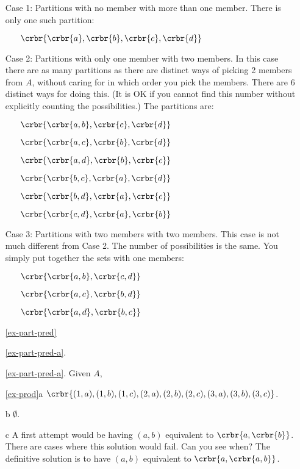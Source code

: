 \documentclass[11pt]{article}
\begin{document}
\begin{enumerate}
Case 1: Partitions with no member with more than one member. There is only one
such partition:

\begin{itemize}

\item[] $\crbr{\crbr{a},\crbr{b},\crbr{c},\crbr{d}}$

\end{itemize}

Case 2: Partitions with only one member with two members. In this case there are
as many partitions as there are distinct ways of picking 2 members from $A$,
without caring for in which order you pick the members. There are 6 distinct
ways for doing this. (It is OK if you cannot find this number without explicitly
counting the possibilities.) The partitions are:

\begin{itemize}
\item[] $\crbr{\crbr{a,b},\crbr{c},\crbr{d}}$
\item[] $\crbr{\crbr{a,c},\crbr{b},\crbr{d}}$
\item[] $\crbr{\crbr{a,d},\crbr{b},\crbr{c}}$
\item[] $\crbr{\crbr{b,c},\crbr{a},\crbr{d}}$
\item[] $\crbr{\crbr{b,d},\crbr{a},\crbr{c}}$
\item[] $\crbr{\crbr{c,d},\crbr{a},\crbr{b}}$
\end{itemize}

Case 3: Partitions with two members with two members. This case is not much
different from Case 2. The number of possibilities is the same. You simply put
together the sets with one members: 

\begin{itemize}
\item[] $\crbr{\crbr{a,b},\crbr{c,d}}$
\item[] $\crbr{\crbr{a,c},\crbr{b,d}}$
\item[] $\crbr{\crbr{a,d},\crbr{b,c}}$
\end{itemize}

\item[\ref{ex-part-pred}]\hypertarget{ex-part-pred-sol}{}

\ref{ex-part-pred-a}. 

\ref{ex-part-pred-a}. Given $A$, 

\item[\ref{ex-prod}a]
$\crbr{(1,a),(1,b),(1,c),(2,a),(2,b),(2,c),(3,a),(3,b),(3,c)}$.
\item[b] $\emptyset$.
\item[c] A first attempt would be having $(a,b)$ equivalent to
$\crbr{a,\crbr{b}}$. There are cases where this solution would fail. Can you see
when? The definitive solution is to have $(a,b)$ equivalent to
$\crbr{a,\crbr{a,b}}$.


\end{enumerate}
\end{document}
